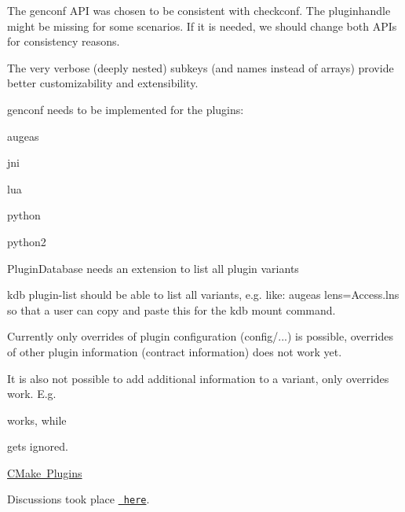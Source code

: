 \begin{DoxyItemize}
\item The {\ttfamily genconf} A\+PI was chosen to be consistent with {\ttfamily checkconf}. The pluginhandle might be missing for some scenarios. If it is needed, we should change both A\+P\+Is for consistency reasons.
\item The very verbose (deeply nested) subkeys (and names instead of arrays) provide better customizability and extensibility.
\end{DoxyItemize}


\begin{DoxyItemize}
\item {\ttfamily genconf} needs to be implemented for the plugins\+:
\begin{DoxyItemize}
\item augeas
\item jni
\item lua
\item python
\item python2
\end{DoxyItemize}
\item {\ttfamily Plugin\+Database} needs an extension to list all plugin variants
\item {\ttfamily kdb plugin-\/list} should be able to list all variants, e.\+g. like\+: {\ttfamily augeas lens=Access.\+lns} so that a user can copy and paste this for the {\ttfamily kdb mount} command.
\end{DoxyItemize}

Currently only overrides of plugin configuration ({\ttfamily config/...}) is possible, overrides of other plugin information (contract information) does not work yet.

It is also not possible to add additional information to a variant, only overrides work. E.\+g.


\begin{DoxyCode}{0}
\end{DoxyCode}


works, while


\begin{DoxyCode}{0}
\end{DoxyCode}


gets ignored.


\begin{DoxyItemize}
\item \mbox{\hyperlink{doc_decisions_cmake_plugins_md}{C\+Make Plugins}}
\end{DoxyItemize}

Discussions took place \href{https://git.libelektra.org/issues/1006}{\texttt{ here}}. 